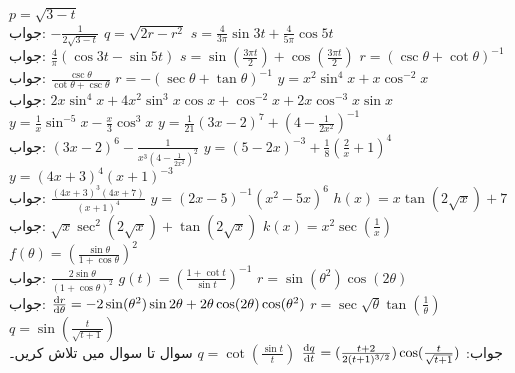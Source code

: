 $p=\sqrt{3-t}$\\
جواب:\quad
$-\tfrac{1}{2\sqrt{3-t}}$
$q=\sqrt{2r-r^2}$
$s=\tfrac{4}{3\pi}\sin 3t+\tfrac{4}{5\pi}\cos 5t$\\
جواب:\quad
$\tfrac{4}{\pi}(\cos 3t-\sin 5t)$
$s=\sin(\tfrac{3\pi t}{2})+\cos(\tfrac{3\pi t}{2})$
$r=(\csc \theta +\cot \theta)^{-1}$\\
جواب:\quad
$\tfrac{\csc \theta}{\cot\theta+\csc\theta}$
$r=-(\sec \theta+\tan \theta)^{-1}$
$y=x^2\sin^4 x+x\cos^{-2}x$\\
جواب:\quad
$2x\sin^4x+4x^2\sin^3x\cos x+\cos^{-2}x+2x\cos^{-3}x\sin x$
$y=\tfrac{1}{x}\sin^{-5}x-\tfrac{x}{3}\cos^3 x$
$y=\tfrac{1}{21}(3x-2)^7+(4-\tfrac{1}{2x^2})^{-1}$\\
جواب:\quad
$(3x-2)^6-\tfrac{1}{x^3(4-\tfrac{1}{2x^2})^2}$
$y=(5-2x)^{-3}+\tfrac{1}{8}(\tfrac{2}{x}+1)^4$
$y=(4x+3)^4(x+1)^{-3}$\\
جواب:\quad
$\tfrac{(4x+3)^3(4x+7)}{(x+1)^4}$
$y=(2x-5)^{-1}(x^2-5x)^6$
$h(x)=x\tan(2\sqrt{x})+7$\\
جواب:\quad
$\sqrt{x}\sec^2(2\sqrt{x})+\tan(2\sqrt{x})$
$k(x)=x^2\sec(\tfrac{1}{x})$
$f(\theta)=(\tfrac{\sin\theta}{1+\cos\theta})^2$\\
جواب:\quad
$\tfrac{2\sin\theta}{(1+\cos\theta)^2}$
$g(t)=(\tfrac{1+\cot t}{\sin t})^{-1}$
$r=\sin (\theta^2)\cos(2\theta)$\\
جواب:\quad
$\tfrac{\dif r}{\dif \theta}=-2\sin(\theta^2)\sin2\theta+2\theta\cos(2\theta)\cos(\theta^2)$
$r=\sec\sqrt{\theta}\tan(\tfrac{1}{\theta})$
$q=\sin(\tfrac{t}{\sqrt{t+1}})$\\
جواب:\quad
$\tfrac{\dif q}{\dif t}=(\tfrac{t+2}{2(t+1)^{3/2}})\cos(\tfrac{t}{\sqrt{t+1}})$
$q=\cot(\tfrac{\sin t}{t})$
سوال  تا سوال  میں  تلاش کریں۔

